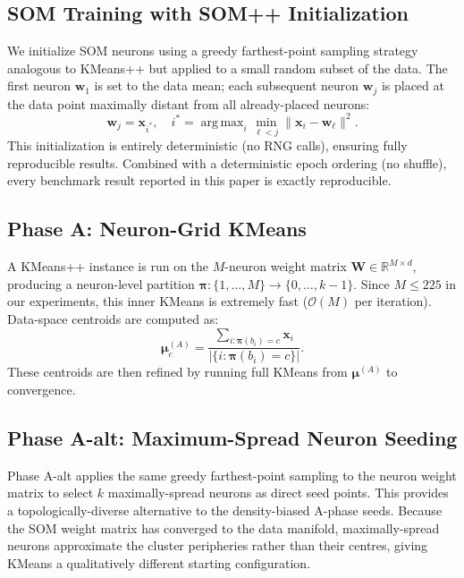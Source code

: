 \documentclass[journal]{IEEEtran}
\DeclareMathOperator*{\argmax}{arg\,max}
\begin{document}
\subsection{SOM Training with SOM++ Initialization}

We initialize SOM neurons using a greedy farthest-point sampling strategy analogous to KMeans++ but applied to a small random subset of the data. The first neuron $\mathbf{w}_1$ is set to the data mean; each subsequent neuron $\mathbf{w}_j$ is placed at the data point maximally distant from all already-placed neurons:
\begin{equation}
  \mathbf{w}_j = \mathbf{x}_{i^*}, \quad i^* = \argmax_{i} \min_{\ell < j} \|\mathbf{x}_i - \mathbf{w}_\ell\|^2.
\end{equation}
This initialization is entirely deterministic (no RNG calls), ensuring fully reproducible results. Combined with a deterministic epoch ordering (no shuffle), every benchmark result reported in this paper is exactly reproducible.

\subsection{Phase A: Neuron-Grid KMeans}

A KMeans++ instance is run on the $M$-neuron weight matrix $\mathbf{W} \in \mathbb{R}^{M \times d}$, producing a neuron-level partition $\boldsymbol{\pi}: \{1,\ldots,M\} \to \{0,\ldots,k-1\}$. Since $M \le 225$ in our experiments, this inner KMeans is extremely fast ($\mathcal{O}(M)$ per iteration). Data-space centroids are computed as:
\begin{equation}
  \boldsymbol{\mu}_c^{(A)} = \frac{\sum_{i : \boldsymbol{\pi}(b_i) = c} \mathbf{x}_i}{\left|\{i : \boldsymbol{\pi}(b_i) = c\}\right|}.
  \label{eq:phase_a_cent}
\end{equation}
These centroids are then refined by running full KMeans from $\boldsymbol{\mu}^{(A)}$ to convergence.

\subsection{Phase A-alt: Maximum-Spread Neuron Seeding}

Phase A-alt applies the same greedy farthest-point sampling to the neuron weight matrix to select $k$ maximally-spread neurons as direct seed points. This provides a topologically-diverse alternative to the density-biased A-phase seeds. Because the SOM weight matrix has converged to the data manifold, maximally-spread neurons approximate the cluster peripheries rather than their centres, giving KMeans a qualitatively different starting configuration.
\end{document}
